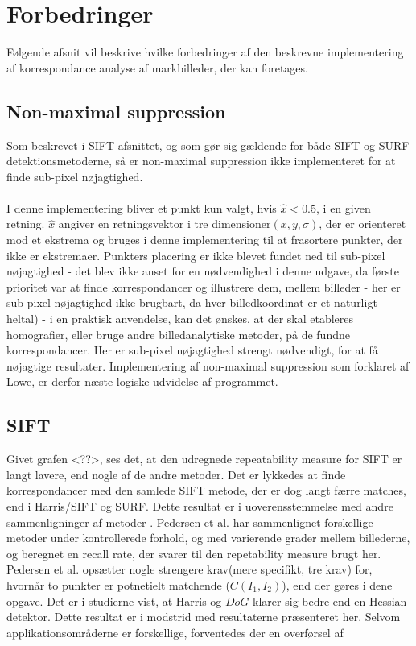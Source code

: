 \section{Forbedringer}
Følgende afsnit vil beskrive hvilke forbedringer af den beskrevne implementering af korrespondance analyse af markbilleder, der kan foretages. 

\subsection{Non-maximal suppression}
Som beskrevet i SIFT afsnittet, og som gør sig gældende for både SIFT og SURF detektionsmetoderne, så er non-maximal suppression ikke implementeret for at finde sub-pixel nøjagtighed. 
\\
\\
I denne implementering bliver et punkt kun valgt, hvis $\hat{x} < 0.5$, i en given retning. $\hat{x}$ angiver en retningsvektor i tre dimensioner$(x, y, \sigma)$, der er orienteret mod et ekstrema og bruges i denne implementering til at frasortere punkter, der ikke er ekstremaer. Punkters placering er ikke blevet fundet ned til sub-pixel nøjagtighed - det blev ikke anset for en nødvendighed i denne udgave, da første prioritet var at finde korrespondancer og illustrere dem, mellem billeder - her er sub-pixel nøjagtighed ikke brugbart, da hver billedkoordinat er et naturligt heltal) - i en praktisk anvendelse, kan det ønskes, at der skal etableres homografier, eller bruge andre billedanalytiske metoder, på de fundne korrespondancer. Her er sub-pixel nøjagtighed strengt nødvendigt, for at få nøjagtige resultater. Implementering af non-maximal suppression som forklaret af Lowe, er derfor næste logiske udvidelse af programmet. 

\subsection{SIFT}
Givet grafen <??>, ses det, at den udregnede repeatability measure for SIFT er langt lavere, end nogle af de andre metoder. Det er lykkedes at finde korrespondancer med den samlede SIFT metode, der er dog langt færre matches, end i Harris/SIFT og SURF. Dette resultat er i uoverensstemmelse med andre sammenligninger af metoder\cite{kim} \cite{kim2}. Pedersen et al. har sammenlignet forskellige metoder under kontrollerede forhold, og med varierende grader mellem billederne, og beregnet en recall rate, der svarer til den repetability measure brugt her. Pedersen et al. opsætter nogle strengere krav(mere specifikt, tre krav) for, hvornår to punkter er potnetielt matchende ($C(I_1, I_2)$), end der gøres i dene opgave. Det er i studierne vist, at Harris og $DoG$ klarer sig bedre end en Hessian detektor. Dette resultat er i modstrid med resultaterne præsenteret her. Selvom applikationsområderne er forskellige, forventedes der en overførsel af 